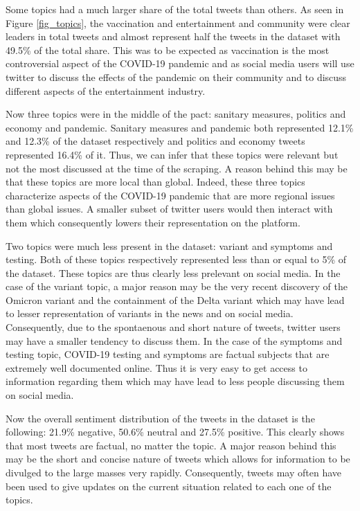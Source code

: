 \documentclass[letterpaper]{article} %
\begin{document}

Some topics had a much larger share of the total tweets than others. As seen in
Figure \ref{fig_topics}, the vaccination and entertainment and community were clear leaders in total tweets and almost represent half the tweets in the dataset with 49.5\% of the total share. This was to be expected as vaccination is the most controversial aspect of the COVID-19 pandemic and as social media users will use twitter to discuss the effects of the pandemic on their community and to discuss different aspects of the entertainment industry. 

Now three topics were in the middle of the pact: sanitary measures, politics and economy and pandemic. Sanitary measures and pandemic both represented 12.1\% and 12.3\% of the dataset respectively and politics and economy tweets represented 16.4\% of it. Thus, we can infer that these topics were relevant but not the most discussed at the time of the scraping. A reason behind this may be that these topics are more local than global. Indeed, these three topics characterize aspects of the COVID-19 pandemic that are more regional issues than global issues. A smaller subset of twitter users would then interact with them which consequently lowers their representation on the platform. 

Two topics were much less present in the dataset: variant and symptoms and testing. Both of these topics respectively represented less than or equal to 5\% of the dataset. These topics are thus clearly less prelevant on social media. In the case of the variant topic,  a major reason may be the very recent discovery of the Omicron variant and the containment of the Delta variant which may have lead to lesser representation of variants in the news and on social media. Consequently, due to the spontaenous and short nature of tweets, twitter users may have a smaller tendency to discuss them. In the case of the symptoms and testing topic, COVID-19 testing and symptoms are factual subjects that are extremely well documented online. Thus it is very easy to get access to information regarding them which may have lead to less people discussing them on social media.

Now the overall sentiment distribution of the tweets in the dataset is the following: 21.9\% negative, 50.6\% neutral and 27.5\% positive. This clearly shows that most tweets are factual, no matter the topic. A major reason behind this may be the short and concise nature of tweets which allows for information to be divulged to the large masses very rapidly. Consequently, tweets may often have been used to give updates on the current situation related to each one of the topics. 
\end{document}
